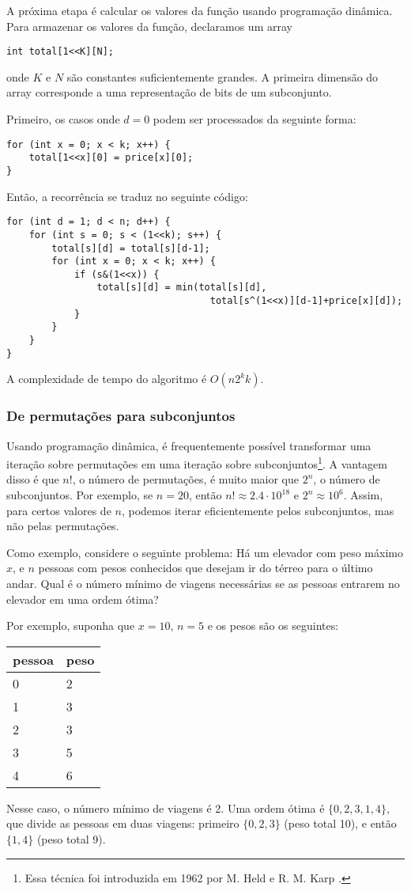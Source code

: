 A próxima etapa é calcular os valores da função
usando programação dinâmica.
Para armazenar os valores da função, declaramos um array
\begin{lstlisting}
int total[1<<K][N];
\end{lstlisting}
onde $K$ e $N$ são constantes suficientemente grandes.
A primeira dimensão do array corresponde a uma
representação de bits de um subconjunto.

Primeiro, os casos onde $d=0$ podem ser processados da seguinte forma:
\begin{lstlisting}
for (int x = 0; x < k; x++) {
    total[1<<x][0] = price[x][0];
}
\end{lstlisting}
Então, a recorrência se traduz no seguinte código:
\begin{lstlisting}
for (int d = 1; d < n; d++) {
    for (int s = 0; s < (1<<k); s++) {
        total[s][d] = total[s][d-1];
        for (int x = 0; x < k; x++) {
            if (s&(1<<x)) {
                total[s][d] = min(total[s][d],
                                    total[s^(1<<x)][d-1]+price[x][d]);
            }
        }
    }
}
\end{lstlisting}
A complexidade de tempo do algoritmo é $O(n 2^k k)$.

\subsubsection{De permutações para subconjuntos}

Usando programação dinâmica, é frequentemente possível
transformar uma iteração sobre permutações em
uma iteração sobre subconjuntos\footnote{Essa técnica foi introduzida em 1962
por M. Held e R. M. Karp \cite{hel62}.}.
A vantagem disso é que
$n!$, o número de permutações,
é muito maior que $2^n$, o número de subconjuntos.
Por exemplo, se $n=20$, então
$n! \approx 2.4 \cdot 10^{18}$ e $2^n \approx 10^6$.
Assim, para certos valores de $n$,
podemos iterar eficientemente pelos subconjuntos, mas não pelas permutações.

Como exemplo, considere o seguinte problema:
Há um elevador com peso máximo $x$,
e $n$ pessoas com pesos conhecidos
que desejam ir do térreo
para o último andar.
Qual é o número mínimo de viagens necessárias
se as pessoas entrarem no elevador em uma ordem ótima?

Por exemplo, suponha que $x=10$, $n=5$
e os pesos são os seguintes:
\begin{center}
\begin{tabular}{ll}
pessoa & peso \\
\hline
0 & 2 \\
1 & 3 \\
2 & 3 \\
3 & 5 \\
4 & 6 \\
\end{tabular}
\end{center}
Nesse caso, o número mínimo de viagens é 2.
Uma ordem ótima é $\{0,2,3,1,4\}$,
que divide as pessoas em duas viagens:
primeiro $\{0,2,3\}$ (peso total 10),
e então $\{1,4\}$ (peso total 9).

